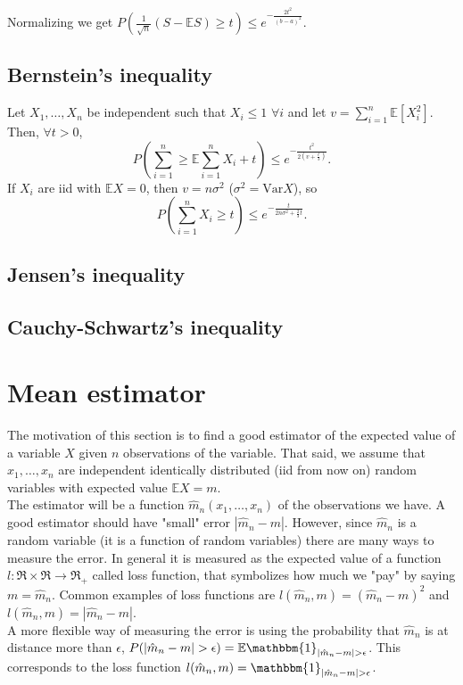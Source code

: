 \documentclass[11pt, english]{article}
\begin{document}
Normalizing we get $P(\frac{1}{\sqrt{n}}(S-\mathbb{E}S)\geq t)\leq e^{-\frac{2t^2}{(b-a)^2}}$.

\subsection*{Bernstein's inequality}

Let $X_1,\dots,X_n$ be independent such that $X_i\leq 1$ $\forall i$ and let $v=\sum\limits_{i=1}^n\mathbb{E}[X_i^2]$. Then, $\forall t>0$,
\begin{equation}
	P(\sum\limits_{i=1}^n\geq\mathbb{E}\sum\limits_{i=1}^n X_i+t)\leq e^{-\frac{t^2}{2(v+\frac{t}{3})}}.
\end{equation}
If $X_i$ are iid with $\mathbb{E}X=0$, then $v=n\sigma^2$ ($\sigma^2=\text{Var}X$), so
\begin{equation}
	P(\sum\limits_{i=1}^n X_i\geq t)\leq e^{-\frac{t}{2n\sigma^2+\frac{2}{3}t}}.
\end{equation} 


\subsection{Jensen's inequality}

\subsection{Cauchy-Schwartz's inequality}

\section{Mean estimator}


The motivation of this section is to find a good estimator of the expected value of a variable $X$ given $n$ observations of the variable. That said, we assume that $x_1,\dots,x_n$ are independent identically distributed (iid from now on) random variables with expected value $\mathbb{E}X=m$.\\

The estimator will be a function $\hat{m}_n(x_1,\dots,x_n)$ of the observations we have. A good estimator should have "small" error $|\hat{m}_n-m|$. However, since $\hat{m}_n$ is a random variable (it is a function of random variables) there are many ways to measure the error. In general it is measured as the expected value of a function $l:\Re\times\Re\rightarrow\Re_+$ called loss function, that symbolizes how much we "pay" by saying $m=\hat{m}_n$. Common examples of loss functions are $l(\hat{m}_n,m)=(\hat{m}_n-m)^2$ and $l(\hat{m}_n,m)=|\hat{m}_n-m|$. \\
A more flexible way of measuring the error is using the probability that $\hat{m}_n$ is at distance more than $\epsilon$, $P(|\hat{m}_n-m|>\epsilon)=\mathbb{E}\mathbbm{1}_{|\hat{m}_n-m|>\epsilon}$. This corresponds to the loss function $l(\hat{m}_n,m)=\mathbbm{1}_{|\hat{m}_n-m|>\epsilon}$.\\
\end{document}
